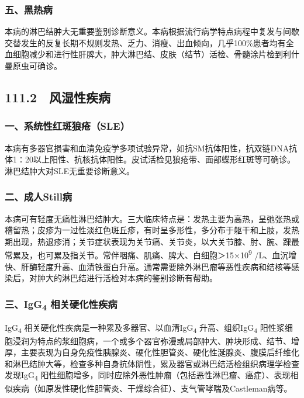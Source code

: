 \subsubsection{五、黑热病}

本病的淋巴结肿大无重要鉴别诊断意义。本病根据流行病学特点病程中复发与间歇交替发生的反复长期不规则发热、乏力、消瘦、出血倾向，几乎100\%患者均有全血细胞减少和进行性肝脾大，肿大淋巴结、皮肤（结节）活检、骨髓涂片检到利什曼原虫可确诊。

\subsection{111.2　风湿性疾病}

\subsubsection{一、系统性红斑狼疮（SLE）}

本病有多器官损害和血清免疫学多项试验异常，如抗SM抗体阳性，抗双链DNA抗体1∶20以上阳性、抗核抗体阳性。皮试活检见狼疮带、面部蝶形红斑等可确诊。淋巴结肿大对SLE无重要诊断意义。

\subsubsection{二、成人Still病}

本病可有轻度无痛性淋巴结肿大。三大临床特点是：发热主要为高热，呈弛张热或稽留热；皮疹为一过性淡红色斑丘疹，有时呈多形性，多分布于躯干和上肢，发热期出现，热退疹消；关节症状表现为关节痛、关节炎，以大关节膝、肘、腕、踝最常累及，也可累及指关节。常伴咽痛、肌痛、脾大、白细胞＞15×10\textsuperscript{9}
/L、血沉增快、肝酶轻度升高、血清铁蛋白升高。通常需要除外淋巴瘤等恶性疾病和结核等感染后，对肿大的淋巴结进行活检对本病的鉴别诊断有帮助。

\subsubsection{三、IgG\textsubscript{4} 相关硬化性疾病}

IgG\textsubscript{4}
相关硬化性疾病是一种累及多器官、以血清IgG\textsubscript{4}
升高、组织IgG\textsubscript{4}
阳性浆细胞浸润为特点的浆细胞病，一个或多个器官弥漫或局部肿大、肿块形成、结节、增厚，主要表现为自身免疫性胰腺炎、硬化性胆管炎、硬化性涎腺炎、腹膜后纤维化和淋巴结肿大等，检查多种自身抗体阴性，累及器官或淋巴结活检组织病理学检查发现IgG\textsubscript{4}
阳性细胞增多，同时应除外恶性肿瘤（包括恶性淋巴瘤、癌症）、表现相似疾病（如原发性硬化性胆管炎、干燥综合征）、支气管哮喘及Castleman病等。

